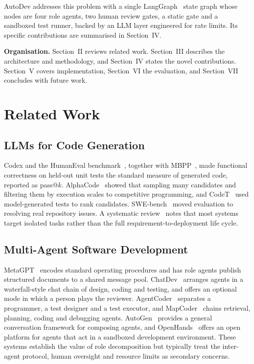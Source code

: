 \documentclass[conference,letterpaper]{IEEEtran}
\begin{document}
AutoDev addresses this problem with a single LangGraph~\cite{langgraph} state
graph whose nodes are four role agents, two human review gates, a static gate
and a sandboxed test runner, backed by an LLM layer engineered for rate limits.
Its specific contributions are summarised in Section~IV.

\textbf{Organisation.} Section~II reviews related work. Section~III describes
the architecture and methodology, and Section~IV states the novel
contributions. Section~V covers implementation, Section~VI the evaluation, and
Section~VII concludes with future work.

\section{Related Work}

\subsection{LLMs for Code Generation}
Codex and the HumanEval benchmark~\cite{chen2021codex}, together with
MBPP~\cite{austin2021mbpp}, made functional correctness on held-out unit tests
the standard measure of generated code, reported as pass@$k$. AlphaCode~\cite{li2022alphacode}
showed that sampling many candidates and filtering them by execution scales to
competitive programming, and CodeT~\cite{chen2023codet} used model-generated
tests to rank candidates. SWE-bench~\cite{jimenez2024swebench} moved evaluation
to resolving real repository issues. A systematic review~\cite{hou2024llm4se}
notes that most systems target isolated tasks rather than the full
requirement-to-deployment life cycle.

\subsection{Multi-Agent Software Development}
MetaGPT~\cite{hong2024metagpt} encodes standard operating procedures and has role
agents publish structured documents to a shared message pool.
ChatDev~\cite{qian2024chatdev} arranges agents in a waterfall-style chat chain of
design, coding and testing, and offers an optional mode in which a person plays
the reviewer. AgentCoder~\cite{huang2023agentcoder} separates a
programmer, a test designer and a test executor, and MapCoder~\cite{islam2024mapcoder}
chains retrieval, planning, coding and debugging agents.
AutoGen~\cite{wu2023autogen} provides a general conversation framework for
composing agents, and OpenHands~\cite{wang2025openhands} offers an open platform
for agents that act in a sandboxed development environment. These systems
establish the value of role decomposition but typically treat the inter-agent
protocol, human oversight and resource limits as secondary concerns.
\end{document}
